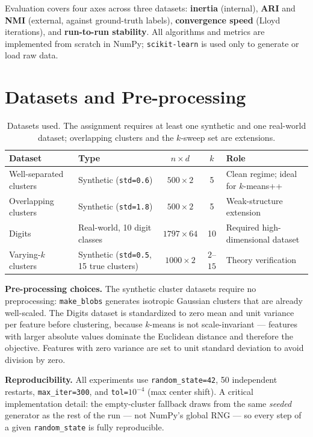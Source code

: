 \documentclass[11pt,a4paper]{article}
\begin{document}
Evaluation covers four axes across three datasets: \textbf{inertia} (internal),
\textbf{ARI} and \textbf{NMI} (external, against ground-truth labels),
\textbf{convergence speed} (Lloyd iterations), and \textbf{run-to-run stability}.
All algorithms and metrics are implemented from scratch in NumPy;
\texttt{scikit-learn} is used only to generate or load raw data.

\section{Datasets and Pre-processing}

\begin{table}[H]
\centering\small
\caption{Datasets used. The assignment requires at least one synthetic and one real-world
         dataset; overlapping clusters and the $k$-sweep set are extensions.}
\label{tab:datasets}
\begin{tabular}{llccl}
\toprule
\textbf{Dataset} & \textbf{Type} & $n\times d$ & $k$ & \textbf{Role} \\
\midrule
Well-separated clusters & Synthetic (\texttt{std=0.6}) & $500\times2$ & 5
  & Clean regime; ideal for $k$-means++ \\
Overlapping clusters & Synthetic (\texttt{std=1.8}) & $500\times2$ & 5
  & Weak-structure extension \\
Digits & Real-world, 10 digit classes & $1797\times64$ & 10
  & Required high-dimensional dataset \\
Varying-$k$ clusters & Synthetic (\texttt{std=0.5}, 15 true clusters)
  & $1000\times2$ & $2$--$15$ & Theory verification \\
\bottomrule
\end{tabular}
\end{table}

\textbf{Pre-processing choices.}
The synthetic cluster datasets require no preprocessing: \texttt{make\_blobs} generates
isotropic Gaussian clusters that are already well-scaled. The Digits dataset is
standardized to zero mean and unit variance per feature before clustering, because
$k$-means is not scale-invariant — features with larger absolute values dominate the
Euclidean distance and therefore the objective. Features with zero variance are set to
unit standard deviation to avoid division by zero.

\textbf{Reproducibility.} All experiments use \texttt{random\_state=42}, 50 independent
restarts, \texttt{max\_iter=300}, and \texttt{tol=}$10^{-4}$ (max center shift).
A critical implementation detail: the empty-cluster fallback draws from the same
\emph{seeded} generator as the rest of the run — not NumPy's global RNG — so every
step of a given \texttt{random\_state} is fully reproducible.
\end{document}
